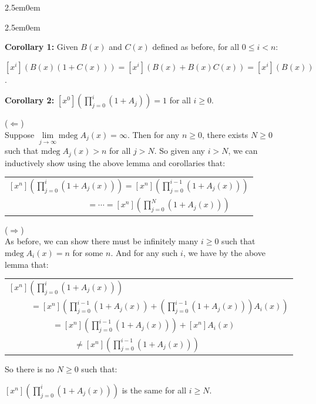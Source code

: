 \documentclass{book}
\newenvironment{myIndent}{%
   \begin{adjustwidth}{2.5em}{0em}%
}{%
   \end{adjustwidth}%
}
\newcommand{\blab}[1]{\textbf{#1}}
\newcommand{\mdeg}{\mathrm{mdeg}\phantom{.}}
\newcommand{\retTwo}{\hfill\bigbreak}
\begin{document}
\begin{myIndent}
\begin{itemize}
\begin{myIndent}
         \blab{Corollary 1:} Given $B(x)$ and $C(x)$ defined as before, for all $0 \leq i < n$:
         
         {\centering $[x^i](B(x)(1 + C(x))) = [x^i](B(x) + B(x)C(x)) = [x^i](B(x))$.\retTwo\par}

         \blab{Corollary 2:} $[x^0]\left(\prod\limits_{j = 0}^i (1 + A_j)\right) = 1$ for all $i \geq 0$.\retTwo

         ($\Longleftarrow$)\\
         Suppose $\lim\limits_{j \rightarrow \infty} \mdeg A_j(x) = \infty$. Then for any $n \geq 0$, there exists $N \geq 0$\\ [-1pt] such that $\mdeg A_j(x) > n$ for all $j > N$. So given any $i > N$, we can\\ [3pt] inductively show using the above lemma and corollaries that:\newpage

         {\centering 
         \begin{tabular}{l}
            $[x^n]\left(\prod\limits_{j = 0}^{i}(1 + A_j(x))\right) = [x^n]\left(\prod\limits_{j = 0}^{i - 1}(1 + A_j(x))\right)$ \\ $\phantom{aaaaaaaaaaaaaaaaaa} = \cdots = [x^n]\left(\prod\limits_{j = 0}^N(1 + A_j(x))\right)$
         \end{tabular} \retTwo\par}

         ($\Longrightarrow$)\\
         As before, we can show there must be infinitely many $i \geq 0$ such that\\ $\mdeg A_i(x) = n$ for some $n$. And for any such $i$, we have by the above\\ lemma that:

         {\centering 
         \begin{tabular}{l}
            $[x^n]\left(\prod\limits_{j = 0}^i (1 + A_j(x))\right)$ \\ $\phantom{aaaaa} = [x^n]\left(\prod\limits_{j = 0}^{i -1}(1 + A_j(x)) + \left(\prod\limits_{j = 0}^{i -1}(1 + A_j(x))\right)A_i(x)\right)$ \\ [8pt]
            $\phantom{aaaaaaaaaa} = [x^n]\left(\prod\limits_{j = 0}^{i -1}(1 + A_j(x))\right) + [x^n]A_i(x) $\\ [8pt]
            $\phantom{aaaaaaaaaaaaaaa} \neq [x^n]\left(\prod\limits_{j = 0}^{i -1}(1 + A_j(x))\right)$
         \end{tabular}\retTwo\par}

         So there is no $N \geq 0$ such that:

         {\centering $[x^n]\left(\prod\limits_{j = 0}^i(1 + A_j(x))\right)$ is the same for all $i \geq N$.  \retTwo\par}
      \end{myIndent}
   \end{itemize}
\end{myIndent}
\end{document}
